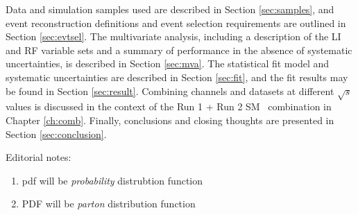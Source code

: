 

Data and simulation samples used are described in Section \ref{sec:samples}, and event reconstruction definitions and event selection requirements are outlined in Section \ref{sec:evtsel}.  The multivariate analysis, including a description of the LI and RF variable sets and a summary of performance  in the absence of systematic uncertainties, is described in Section \ref{sec:mva}.  The statistical fit model and systematic uncertainties are described in Section \ref{sec:fit}, and the fit results may be found in Section \ref{sec:result}.  Combining channels and datasets at different $\sqrt{s}$ values is discussed in the context of the Run 1 + Run 2 SM \vhbb\, combination in Chapter \ref{ch:comb}.  Finally, conclusions and closing thoughts are presented in Section \ref{sec:conclusion}.


Editorial notes: 
\begin{enumerate}
\item pdf will be \emph{probability} distrubtion function
\item PDF will be \emph{parton} distribution function
\end{enumerate}
